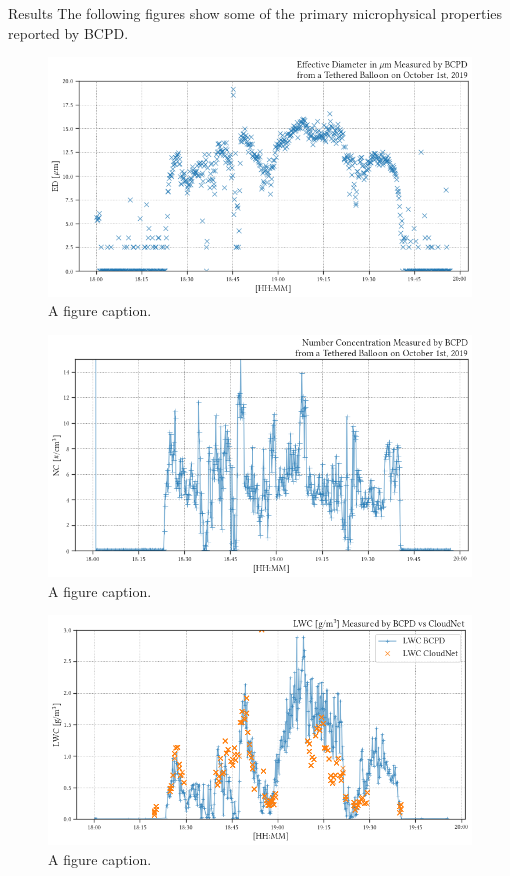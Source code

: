 \documentclass[final]{beamer}
\newlength{\colwidth}
\begin{document}
\begin{frame}[t]
\begin{columns}[t]
\begin{column}{\colwidth}
      \begin{alertblock}{Results}
        The following figures show some of the primary microphysical properties reported by BCPD.

        \begin{figure}
          \centering
          \includegraphics[width=\colwidth]{figure/ts_ed.png}
          \caption{A figure caption.}
        \end{figure}

        \begin{figure}
          \centering
          \includegraphics[width=\colwidth]{figure/ts_nc.png}
          \caption{A figure caption.}
        \end{figure}

        \begin{figure}
          \centering
          \includegraphics[width=\colwidth]{figure/ts_lwc.png}
          \caption{A figure caption.}
        \end{figure}


\end{alertblock}
\end{column}
\end{columns}
\end{frame}
\end{document}
